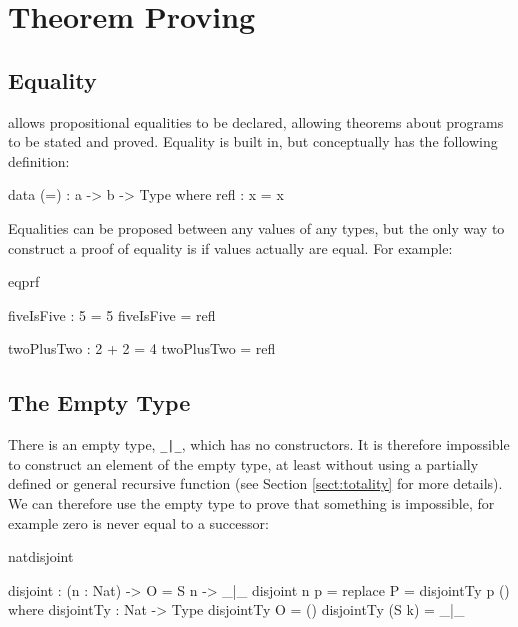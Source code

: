 \section{Theorem Proving}

\subsection{Equality}

\Idris{} allows propositional equalities to be declared, allowing theorems about
programs to be stated and proved. Equality is built in, but conceptually has
the following definition:

\begin{SaveVerbatim}{}

data (=) : a -> b -> Type where
   refl : x = x

\end{SaveVerbatim}
\useverb{}

\noindent
Equalities can be proposed between any values of any types, but the only way to
construct a proof of equality is if values actually are equal. For example:

\begin{SaveVerbatim}{eqprf}

fiveIsFive : 5 = 5
fiveIsFive = refl

twoPlusTwo : 2 + 2 = 4
twoPlusTwo = refl

\end{SaveVerbatim}

\subsection{The Empty Type}

\label{sect:empty}

There is an empty type, \texttt{\_|\_}, which has no constructors. It is
therefore impossible to construct an element of the empty type, at least
without using a partially defined or general recursive function (see Section
\ref{sect:totality} for more details). We can therefore use the empty type
to prove that something is impossible, for example zero is never equal
to a successor:

\begin{SaveVerbatim}{natdisjoint}

disjoint : (n : Nat) -> O = S n -> _|_
disjoint n p = replace {P = disjointTy} p ()
  where
    disjointTy : Nat -> Type
    disjointTy O = ()
    disjointTy (S k) = _|_

\end{SaveVerbatim}

